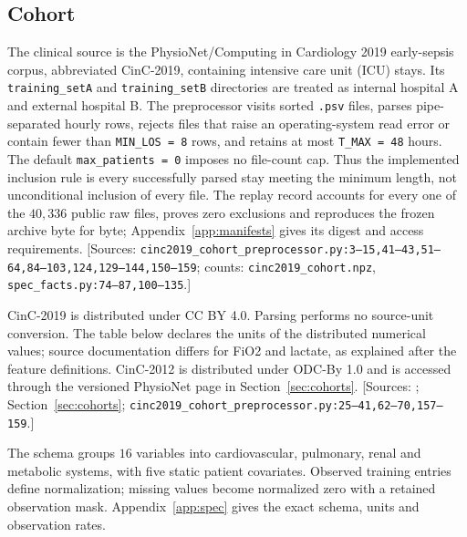\subsection{Cohort}\label{app:cohortschema}


The clinical source is the PhysioNet/Computing in Cardiology 2019 early-sepsis corpus, abbreviated CinC-2019, containing intensive care unit (ICU) stays. Its \texttt{training\_\allowbreak{}setA} and \texttt{training\_\allowbreak{}setB} directories are treated as internal hospital A and external hospital B. The preprocessor visits sorted \texttt{.\allowbreak{}psv} files, parses pipe-separated hourly rows, rejects files that raise an operating-system read error or contain fewer than \texttt{MIN\_\allowbreak{}LOS =\allowbreak{} 8} rows, and retains at most \texttt{T\_\allowbreak{}MAX =\allowbreak{} 48} hours. The default \texttt{max\_\allowbreak{}patients =\allowbreak{} 0} imposes no file-count cap. Thus the implemented inclusion rule is every successfully parsed stay meeting the minimum length, not unconditional inclusion of every file. The replay record accounts for every one of the $40{,}336$ public raw files, proves zero exclusions and reproduces the frozen archive byte for byte; Appendix~\ref{app:manifests} gives its digest and access requirements. [Sources: \texttt{cinc2019\_\allowbreak{}cohort\_\allowbreak{}preprocessor.\allowbreak{}py:\allowbreak{}3–\allowbreak{}15,\allowbreak{}41–\allowbreak{}43,\allowbreak{}51–\allowbreak{}64,\allowbreak{}84–\allowbreak{}103,\allowbreak{}124,\allowbreak{}129–\allowbreak{}144,\allowbreak{}150–\allowbreak{}159}; counts: \texttt{cinc2019\_\allowbreak{}cohort.\allowbreak{}npz}, \texttt{spec\_\allowbreak{}facts.\allowbreak{}py:\allowbreak{}74–\allowbreak{}87,\allowbreak{}100–\allowbreak{}135}.]

CinC-2019 is distributed under CC BY 4.0. Parsing performs no source-unit conversion. The table below declares the units of the distributed numerical values; source documentation differs for FiO2 and lactate, as explained after the feature definitions. CinC-2012 is distributed under ODC-By 1.0 and is accessed through the versioned PhysioNet page in Section~\ref{sec:cohorts}. [Sources: ; Section~\ref{sec:cohorts}; \texttt{cinc2019\_\allowbreak{}cohort\_\allowbreak{}preprocessor.\allowbreak{}py:\allowbreak{}25–\allowbreak{}41,\allowbreak{}62–\allowbreak{}70,\allowbreak{}157–\allowbreak{}159}.]

The schema groups $16$ variables into cardiovascular, pulmonary, renal and metabolic systems, with five static patient covariates. Observed training entries define normalization; missing values become normalized zero with a retained observation mask. Appendix~\ref{app:spec} gives the exact schema, units and observation rates.


